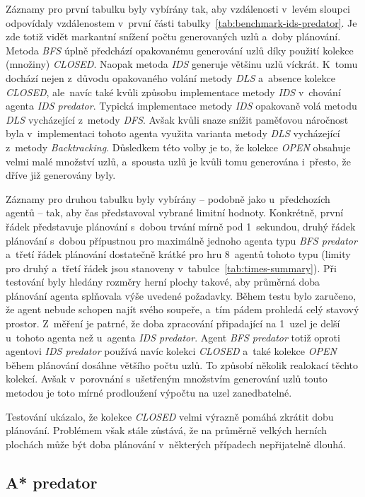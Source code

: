 Záznamy pro první tabulku byly vybírány tak, aby vzdálenosti v~levém sloupci odpovídaly vzdálenostem v~první části tabulky~\ref{tab:benchmark-ids-predator}. Je zde totiž vidět markantní snížení počtu generovaných uzlů a~doby plánování. Metoda \emph{BFS} úplně předchází opakovanému generování uzlů díky použití kolekce (množiny) \emph{CLOSED}. Naopak metoda \emph{IDS} generuje většinu uzlů víckrát. K~tomu dochází nejen z~důvodu opakovaného volání metody \emph{DLS} a~absence kolekce \emph{CLOSED}, ale~navíc také kvůli způsobu implementace metody \emph{IDS} v~chování agenta \emph{IDS predator}. Typická implementace metody \emph{IDS} opakovaně volá metodu \emph{DLS} vycházející z~metody \emph{DFS}. Avšak kvůli snaze snížit paměťovou náročnost byla v~implementaci tohoto agenta využita varianta metody \emph{DLS} vycházející z~metody \emph{Backtracking}. Důsledkem této volby je to, že kolekce \emph{OPEN} obsahuje velmi malé množství uzlů, a~spousta uzlů je kvůli tomu generována i~přesto, že dříve již generovány byly.

Záznamy pro druhou tabulku byly vybírány -- podobně jako u~předchozích agentů -- tak, aby čas představoval vybrané limitní hodnoty. Konkrétně, první řádek představuje plánování s~dobou trvání mírně pod 1~sekundou, druhý řádek plánování s~dobou přípustnou pro maximálně jednoho agenta typu \emph{BFS predator} a~třetí řádek plánování dostatečně krátké pro hru 8~agentů tohoto typu (limity pro druhý a~třetí řádek jsou stanoveny v~tabulce~\ref{tab:times-summary}). Při testování byly hledány rozměry herní plochy takové, aby průměrná doba plánování agenta splňovala výše uvedené požadavky. Během testu bylo zaručeno, že agent nebude schopen najít svého soupeře, a~tím pádem prohledá celý stavový prostor. Z~měření je patrné, že doba zpracování připadající na 1~uzel je delší u~tohoto agenta než u~agenta \emph{IDS predator}. Agent \emph{BFS predator} totiž oproti agentovi \emph{IDS predator} používá navíc kolekci \emph{CLOSED} a~také kolekce \emph{OPEN} během plánování dosáhne většího počtu uzlů. To způsobí několik realokací těchto kolekcí. Avšak v~porovnání s~ušetřeným množstvím generování uzlů touto metodou je toto mírné prodloužení výpočtu na uzel zanedbatelné.

Testování ukázalo, že kolekce \emph{CLOSED} velmi výrazně pomáhá zkrátit dobu plánování. Problémem však stále zůstává, že na průměrně velkých herních plochách může být doba plánování v~některých případech nepřijatelně dlouhá.

\subsection*{A* predator}

